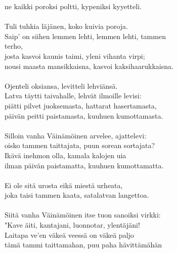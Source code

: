 ne kaikki poroksi poltti, kypeniksi kyyetteli.                  \\
                                                                \\
Tuli tuhkia läjänen, koko kuivia poroja.                        \\
Saip' on siihen lemmen lehti, lemmen lehti, tammen              \\
terho,                                                          \\
josta kasvoi kaunis taimi, yleni vihanta virpi;                 \\
nousi maasta mansikkaisna, kasvoi kaksihaarukkaisna.            \\
                                                                \\
Ojenteli oksiansa, levitteli lehviänsä.                         \\
Latva täytti taivahalle, lehvät ilmoille levisi:                \\
piätti pilvet juoksemasta, hattarat hasertamasta,               \\
päivän peitti paistamasta, kuuhuen kumottamasta.                \\
                                                                \\
Silloin vanha Väinämöinen arvelee, ajattelevi:                  \\
oisko tammen taittajata, puun sorean sortajata?                 \\
Ikävä inehmon olla, kamala kalojen uia                          \\
ilman päivän paistamatta, kuuhuen kumottamatta.                 \\
                                                                \\
Ei ole sitä urosta eikä miestä urheata,                         \\
joka taisi tammen kaata, satalatvan langettoa.                  \\
                                                                \\
Siitä vanha Väinämöinen itse tuon sanoiksi virkki:              \\
"Kave äiti, kantajani, luonnotar, ylentäjäni!                   \\
Laitapa ve'en väkeä  veessä on väkeä paljo                      \\
tämä tammi taittamahan, puu paha hävittämähän                   \\
